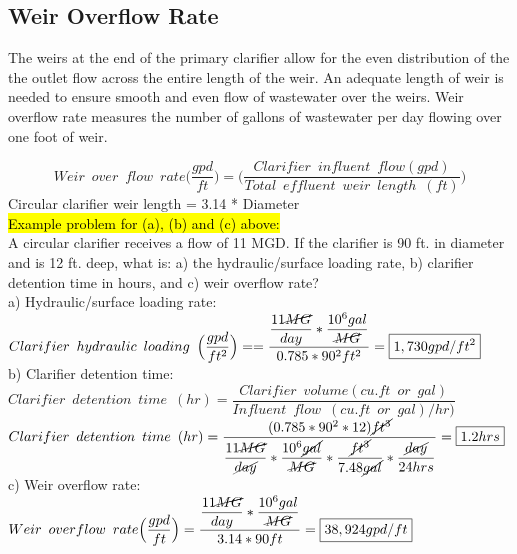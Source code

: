 \subsection{Weir Overflow Rate}
The weirs at the end of the primary clarifier allow for the even distribution of the the outlet flow across the entire length of the weir.  An adequate length of weir is needed to ensure smooth and even flow of wastewater over the weirs.  Weir overflow rate measures the number of gallons of wastewater per day flowing over one foot of weir. 

		$$Weir \enspace over \enspace flow \enspace rate \Big(\dfrac{gpd}{ft}\Big) =\Big(\dfrac{Clarifier \enspace influent \enspace  flow (gpd)}{Total \enspace effluent 					\enspace weir \enspace length \enspace (ft)}\Big)$$
		Circular clarifier weir length = 3.14 * Diameter\\

\hl{Example problem for (a), (b) and (c) above:}\\
		\vspace{0.2cm}
A circular clarifier receives a flow of 11 MGD.  If the clarifier is 90 ft. in diameter and is 12 ft. deep, what is: a) the hydraulic/surface loading rate, b) clarifier detention time in hours, and c) weir overflow rate?\\
		\vspace{0.2cm}
a) Hydraulic/surface loading rate:\\
$Clarifier \enspace hydraulic \enspace loading \enspace 	\Big(\dfrac{gpd}{ft^2}\Big) ==\dfrac{\dfrac{11\cancel{MG}}{{day}}*\dfrac{10^6gal}{\cancel{MG}}}{0.785*90^2 ft^2}=\boxed{1,730gpd/ft^2}$\\
		\vspace{0.5cm}
b) Clarifier detention time:\\
$Clarifier \enspace detention \enspace time \enspace (hr) = 	\dfrac{ Clarifier \enspace volume (cu.ft \enspace or \enspace gal)}{Influent \enspace flow \enspace (cu.ft \enspace or \enspace gal)/hr)}$\\
		\vspace{0.2cm}
$Clarifier \enspace detention \enspace time \enspace (hr) = 	\dfrac{(0.785*90^2*12)\cancel{ft^3}}{\dfrac{11\cancel{MG}}{\cancel{day}}*\dfrac{10^6\cancel{gal}}{\cancel{MG}}*\dfrac{\cancel{ft^3}}{7.48\cancel{gal}}*\dfrac{\cancel{day}}{24hrs}}=\boxed{1.2hrs}$\\
		\vspace{0.5cm}
c) Weir overflow rate:\\
		\vspace{0.2cm} 
$Weir \enspace overflow \enspace rate \Big(\dfrac{gpd}{ft}\Big) =\dfrac{\dfrac{11\cancel{MG}}{{day}}*\dfrac{10^6gal}{\cancel{MG}}}{3.14*90 ft}=\boxed{38,924gpd/ft}$\\

